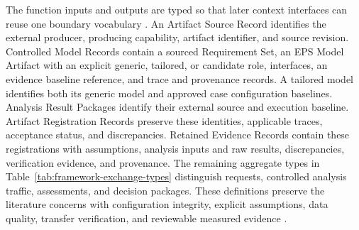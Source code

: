 \documentclass[11pt,a4paper]{article}
\begin{document}
The function inputs and outputs are typed so that later context interfaces can reuse one boundary vocabulary \citep[Sec.~17.3.3]{friedenthal2014practical}. An Artifact Source Record identifies the external producer, producing capability, artifact identifier, and source revision. Controlled Model Records contain a sourced Requirement Set, an EPS Model Artifact with an explicit generic, tailored, or candidate role, interfaces, an evidence baseline reference, and trace and provenance records. A tailored model identifies both its generic model and approved case configuration baselines. Analysis Result Packages identify their external source and execution baseline. Artifact Registration Records preserve these identities, applicable traces, acceptance status, and discrepancies. Retained Evidence Records contain these registrations with assumptions, analysis inputs and raw results, discrepancies, verification evidence, and provenance. The remaining aggregate types in Table~\ref{tab:framework-exchange-types} distinguish requests, controlled analysis traffic, assessments, and decision packages. These definitions preserve the literature concerns with configuration integrity, explicit assumptions, data quality, transfer verification, and reviewable measured evidence \citep{buruso2026modelbased,rostamnia2026digitaltwin,rojasramirez2022comparative}.
\end{document}
